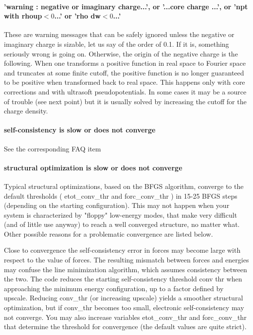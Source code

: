 \documentclass[12pt,a4paper]{article}
\begin{document}
\paragraph{'warning : negative or imaginary charge...', or '...core
  charge ...', or 'npt with rhoup$<0$...' or 'rho dw$<0$...'} 
These are warning messages that can be safely ignored unless the
negative or imaginary charge is sizable, let us say of the order of
0.1. If it is, something seriously wrong is going on. Otherwise, the
origin of the negative charge is the following. When one transforms a
positive function in real space to Fourier space and truncates at some
finite cutoff, the positive function is no longer guaranteed to be
positive when transformed back to real space. This happens only with
core corrections and with ultrasoft pseudopotentials. In some cases it
may be a source of trouble (see next point) but it is usually solved
by increasing the cutoff for the charge density.

\paragraph{self-consistency is slow or does not converge}
See the corresponding FAQ item

\paragraph{structural optimization is slow or does not converge}
Typical structural optimizations, based on the BFGS algorithm,
converge to the default thresholds ( etot\_conv\_thr and
forc\_conv\_thr ) in 15-25 BFGS steps (depending on the 
starting configuration). This may not happen when your
system is characterized by "floppy" low-energy modes, that make very
difficult (and of little use anyway) to reach a well converged structure, no
matter what. Other possible reasons for a problematic convergence are listed
below.
    
Close to convergence the self-consistency error in forces may become large
with respect to the value of forces. The resulting mismatch between forces
and energies may confuse the line minimization algorithm, which assumes
consistency between the two. The code reduces the starting self-consistency
threshold conv thr when approaching the minimum energy configuration, up
to a factor defined by upscale. Reducing conv\_thr (or increasing upscale)
yields a smoother structural optimization, but if conv\_thr becomes too small,
electronic self-consistency may not converge. You may also increase variables
etot\_conv\_thr and forc\_conv\_thr that determine the threshold for
convergence (the default values are quite strict).
    
\end{document}
